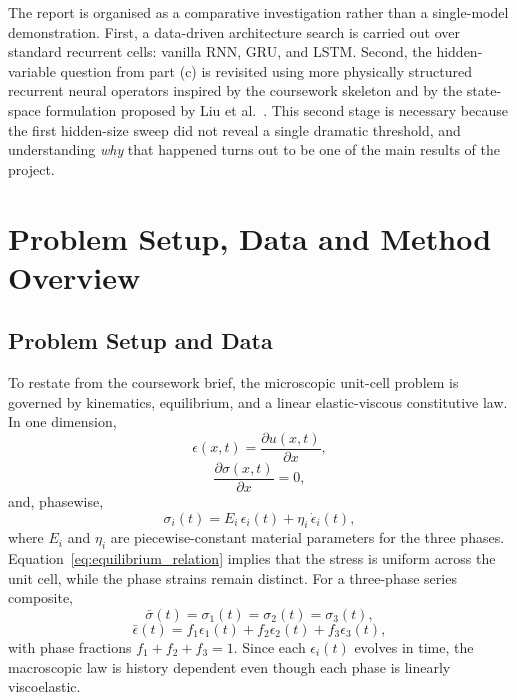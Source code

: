 \documentclass[11pt,a4paper, onecolumn]{article}
\newcommand{\epsbar}{\bar{\epsilon}}
\newcommand{\sigbar}{\bar{\sigma}}
\begin{document}
The report is organised as a comparative investigation rather than a single-model demonstration. First, a data-driven architecture search is carried out over standard recurrent cells: vanilla RNN, GRU, and LSTM. Second, the hidden-variable question from part (c) is revisited using more physically structured recurrent neural operators inspired by the coursework skeleton and by the state-space formulation proposed by Liu et al.~\cite{Liu_2023}. This second stage is necessary because the first hidden-size sweep did not reveal a single dramatic threshold, and understanding \emph{why} that happened turns out to be one of the main results of the project.

\section{Problem Setup, Data and Method Overview}

\subsection{Problem Setup and Data}

To restate from the coursework brief, the microscopic unit-cell problem is governed by kinematics, equilibrium, and a linear elastic-viscous constitutive law. In one dimension,
\begin{equation}
\epsilon(x,t)=\frac{\partial u(x,t)}{\partial x},
\label{eq:kinematic_relation}
\end{equation}
\begin{equation}
\frac{\partial \sigma(x,t)}{\partial x}=0,
\label{eq:equilibrium_relation}
\end{equation}
and, phasewise,
\begin{equation}
\sigma_i(t)=E_i\,\epsilon_i(t)+\eta_i\,\dot{\epsilon}_i(t),
\label{eq:kelvin_voigt_phase}
\end{equation}
where $E_i$ and $\eta_i$ are piecewise-constant material parameters for the three phases. Equation~\eqref{eq:equilibrium_relation} implies that the stress is uniform across the unit cell, while the phase strains remain distinct. For a three-phase series composite,
\begin{equation}
\sigbar(t)=\sigma_1(t)=\sigma_2(t)=\sigma_3(t),
\label{eq:uniform_stress}
\end{equation}
\begin{equation}
\epsbar(t)=f_1\epsilon_1(t)+f_2\epsilon_2(t)+f_3\epsilon_3(t),
\label{eq:macro_strain_average}
\end{equation}
with phase fractions $f_1+f_2+f_3=1$. Since each $\epsilon_i(t)$ evolves in time, the macroscopic law is history dependent even though each phase is linearly viscoelastic.
\end{document}
